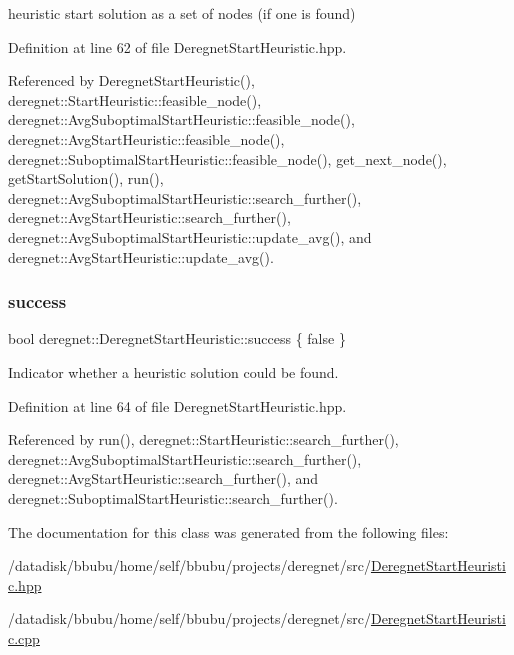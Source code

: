 heuristic start solution as a set of nodes (if one is found) 



Definition at line 62 of file Deregnet\+Start\+Heuristic.\+hpp.



Referenced by Deregnet\+Start\+Heuristic(), deregnet\+::\+Start\+Heuristic\+::feasible\+\_\+node(), deregnet\+::\+Avg\+Suboptimal\+Start\+Heuristic\+::feasible\+\_\+node(), deregnet\+::\+Avg\+Start\+Heuristic\+::feasible\+\_\+node(), deregnet\+::\+Suboptimal\+Start\+Heuristic\+::feasible\+\_\+node(), get\+\_\+next\+\_\+node(), get\+Start\+Solution(), run(), deregnet\+::\+Avg\+Suboptimal\+Start\+Heuristic\+::search\+\_\+further(), deregnet\+::\+Avg\+Start\+Heuristic\+::search\+\_\+further(), deregnet\+::\+Avg\+Suboptimal\+Start\+Heuristic\+::update\+\_\+avg(), and deregnet\+::\+Avg\+Start\+Heuristic\+::update\+\_\+avg().

\mbox{\label{classderegnet_1_1DeregnetStartHeuristic_a72fd16ee027f6aa973f1ff29746addba}} 
\subsubsection{\texorpdfstring{success}{success}}
{\footnotesize\ttfamily bool deregnet\+::\+Deregnet\+Start\+Heuristic\+::success \{ false \}\hspace{0.3cm}{\ttfamily [protected]}}



Indicator whether a heuristic solution could be found. 



Definition at line 64 of file Deregnet\+Start\+Heuristic.\+hpp.



Referenced by run(), deregnet\+::\+Start\+Heuristic\+::search\+\_\+further(), deregnet\+::\+Avg\+Suboptimal\+Start\+Heuristic\+::search\+\_\+further(), deregnet\+::\+Avg\+Start\+Heuristic\+::search\+\_\+further(), and deregnet\+::\+Suboptimal\+Start\+Heuristic\+::search\+\_\+further().



The documentation for this class was generated from the following files\+:\begin{DoxyCompactItemize}
\item 
/datadisk/bbubu/home/self/bbubu/projects/deregnet/src/\hyperlink{DeregnetStartHeuristic_8hpp}{Deregnet\+Start\+Heuristic.\+hpp}\item 
/datadisk/bbubu/home/self/bbubu/projects/deregnet/src/\hyperlink{DeregnetStartHeuristic_8cpp}{Deregnet\+Start\+Heuristic.\+cpp}\end{DoxyCompactItemize}
